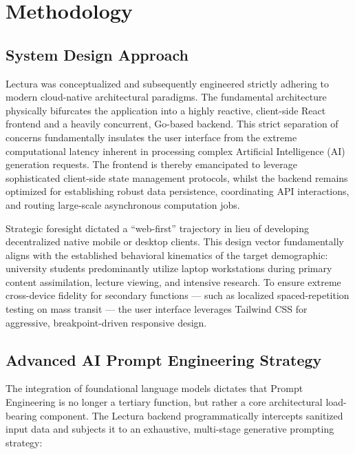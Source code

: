 \chapter{Methodology}
\label{chap:methodology}
\setlength{\parskip}{1em}

\section{System Design Approach}
Lectura was conceptualized and subsequently engineered strictly adhering to modern cloud-native architectural paradigms. The fundamental architecture physically bifurcates the application into a highly reactive, client-side React frontend and a heavily concurrent, Go-based backend. This strict separation of concerns fundamentally insulates the user interface from the extreme computational latency inherent in processing complex Artificial Intelligence (AI) generation requests. The frontend is thereby emancipated to leverage sophisticated client-side state management protocols, whilst the backend remains optimized for establishing robust data persistence, coordinating API interactions, and routing large-scale asynchronous computation jobs.

Strategic foresight dictated a ``web-first'' trajectory in lieu of developing decentralized native mobile or desktop clients. This design vector fundamentally aligns with the established behavioral kinematics of the target demographic: university students predominantly utilize laptop workstations during primary content assimilation, lecture viewing, and intensive research. To ensure extreme cross-device fidelity for secondary functions — such as localized spaced-repetition testing on mass transit — the user interface leverages Tailwind CSS for aggressive, breakpoint-driven responsive design.

\section{Advanced AI Prompt Engineering Strategy}
The integration of foundational language models dictates that Prompt Engineering is no longer a tertiary function, but rather a core architectural load-bearing component. The Lectura backend programmatically intercepts sanitized input data and subjects it to an exhaustive, multi-stage generative prompting strategy:

